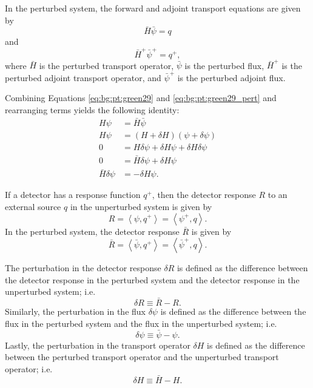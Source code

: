 In the perturbed system, the forward and adjoint transport equations are given by
\begin{equation}\label{eq:bg:pt:green29_pert}
  \bar{H}\bar{\psi} = q
\end{equation}
and
\begin{equation}\label{eq:bg:pt:green163_pert}
  \bar{H}^+\bar{\psi}^+ = q^+,
\end{equation}
where $\bar{H}$ is the perturbed transport operator, $\bar{\psi}$ is the perturbed flux, $\bar{H}^+$ is the perturbed adjoint transport operator, and $\bar{\psi}^+$ is the perturbed adjoint flux.

Combining Equations \ref{eq:bg:pt:green29} and \ref{eq:bg:pt:green29_pert} and rearranging terms yields the following identity:
\begin{equation}\label{eq:bg:pt:green44a}\begin{split}
  H\psi             & = \bar{H}\bar{\psi} \\
  H\psi             & = \left(H+\delta H\right)\left(\psi+\delta\psi\right) \\
  0                 & = H\delta\psi + \delta H\psi + \delta H\delta\psi \\
  0                 & = \bar{H}\delta\psi + \delta H\psi \\
  \bar{H}\delta\psi & = -\delta H\psi.
\end{split}\end{equation}

If a detector has a response function $q^+$, then the detector response $R$ to an external source $q$ in the unperturbed system is given by
\begin{equation}\label{eq:bg:pt:green168}
  R = \left<\psi,q^+\right>
    = \left<\psi^+,q\right>.
\end{equation}
In the perturbed system, the detector response $\bar{R}$ is given by
\begin{equation}\label{eq:bg:pt:r_bar}
  \bar{R} = \left<\bar{\psi},q^+\right>
          = \left<\bar{\psi}^+,q\right>.
\end{equation}

The perturbation in the detector response $\delta R$ is defined as the difference between the detector response in the perturbed system and the detector response in the unperturbed system; i.e.
\begin{equation}\label{eq:bg:pt:delta_r}
  \delta R \equiv \bar{R} - R.
\end{equation}
Similarly, the perturbation in the flux $\delta\psi$ is defined as the difference between the flux in the perturbed system and the flux in the unperturbed system; i.e.
\begin{equation}\label{eq:bg:pt:delta_psi}
  \delta \psi \equiv \bar{\psi} - \psi.
\end{equation}
Lastly, the perturbation in the transport operator $\delta H$ is defined as the difference between the perturbed transport operator and the unperturbed transport operator; i.e.
\begin{equation}\label{eq:bg:pt:delta_H}
  \delta H \equiv \bar{H} - H.
\end{equation}

